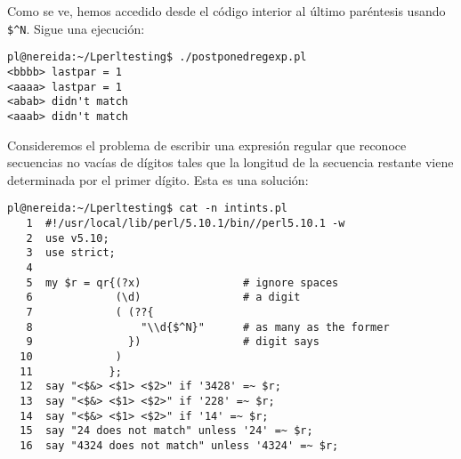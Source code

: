 Como se ve, hemos accedido desde el código interior 
al último paréntesis usando \verb|$^N|.
Sigue una ejecución:
\begin{verbatim}
pl@nereida:~/Lperltesting$ ./postponedregexp.pl
<bbbb> lastpar = 1
<aaaa> lastpar = 1
<abab> didn't match
<aaab> didn't match
\end{verbatim}


Consideremos el problema de escribir una expresión regular
que reconoce secuencias no vacías de dígitos tales que la longitud 
de la secuencia restante viene
determinada por el primer dígito.
Esta es una solución:

\begin{latexonly}
\begin{verbatim}
pl@nereida:~/Lperltesting$ cat -n intints.pl
   1  #!/usr/local/lib/perl/5.10.1/bin//perl5.10.1 -w
   2  use v5.10;
   3  use strict;
   4  
   5  my $r = qr{(?x)                # ignore spaces
   6             (\d)                # a digit
   7             ( (??{
   8                 "\\d{$^N}"      # as many as the former
   9               })                # digit says
  10             )
  11            };
  12  say "<$&> <$1> <$2>" if '3428' =~ $r;
  13  say "<$&> <$1> <$2>" if '228' =~ $r;
  14  say "<$&> <$1> <$2>" if '14' =~ $r;
  15  say "24 does not match" unless '24' =~ $r;
  16  say "4324 does not match" unless '4324' =~ $r;
\end{verbatim}
\end{latexonly}
